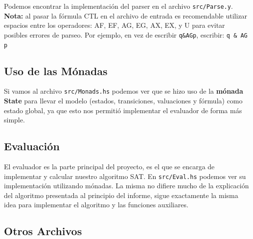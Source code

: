 \documentclass[11pt]{article}
\begin{document}
Podemos encontrar la implementación del parser en el archivo  \texttt{src/Parse.y}. \\

\textbf{Nota:} al pasar la fórmula CTL en el archivo de entrada es recomendable
utilizar espacios entre los operadores: AF, EF, AG, EG, AX, EX, y U para evitar
posibles errores de parseo. Por ejemplo, en vez de escribir \texttt{q\&AGp}, escribir:
\texttt{q \& AG p}

\subsection{Uso de las Mónadas}

Si vamos al archivo \texttt{src/Monads.hs} podemos ver que se hizo
uso de la \textbf{mónada State} para llevar el modelo (estados,
transiciones, valuaciones y fórmula) como estado global, ya que esto
nos permitió implementar el evaluador de forma más simple.

\subsection{Evaluación}

El evaluador es la parte principal del proyecto, es el que se encarga
de implementar y calcular nuestro algoritmo SAT. En \texttt{src/Eval.hs}
podemos ver su implementación utilizando mónadas. La misma no difiere
mucho de la explicación del algoritmo presentada al principio del 
informe, sigue exactamente la misma idea para implementar el algoritmo
y las funciones auxiliares.

\subsection{Otros Archivos}
\end{document}
